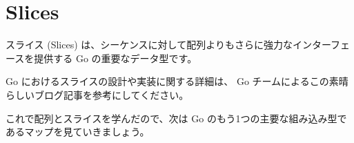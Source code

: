 \section{Slices}

スライス (Slices) は、シーケンスに対して配列よりもさらに強力なインターフェースを提供する Go の重要なデータ型です。




Go におけるスライスの設計や実装に関する詳細は、 Go チームによるこの素晴らしいブログ記事を参考にしてください。

これで配列とスライスを学んだので、次は Go のもう1つの主要な組み込み型であるマップを見ていきましょう。